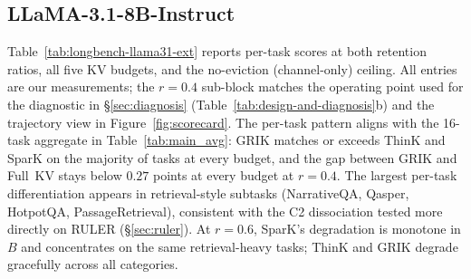 \documentclass{article}
\begin{document}
 
\subsection{LLaMA-3.1-8B-Instruct}
 
Table~\ref{tab:longbench-llama31-ext} reports per-task scores at both retention ratios, all five KV budgets, and the no-eviction (channel-only) ceiling. All entries are our measurements; the $r{=}0.4$ sub-block matches the operating point used for the diagnostic in \S\ref{sec:diagnosis} (Table~\ref{tab:design-and-diagnosis}b) and the trajectory view in Figure~\ref{fig:scorecard}. The per-task pattern aligns with the 16-task aggregate in Table~\ref{tab:main_avg}: GRIK matches or exceeds ThinK and SparK on the majority of tasks at every budget, and the gap between GRIK and Full~KV stays below $0.27$ points at every budget at $r{=}0.4$. The largest per-task differentiation appears in retrieval-style subtasks (NarrativeQA, Qasper, HotpotQA, PassageRetrieval), consistent with the C2 dissociation tested more directly on RULER (\S\ref{sec:ruler}). At $r{=}0.6$, SparK's degradation is monotone in $B$ and concentrates on the same retrieval-heavy tasks; ThinK and GRIK degrade gracefully across all categories.
 
\end{document}
